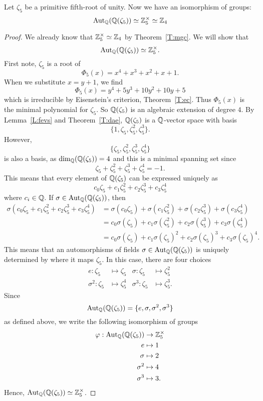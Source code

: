 \documentclass{ximera}
\begin{document}
\begin{example}[$\boldsymbol{\aut_{\pmb\Q}\pmb(\pmb\Q\pmb(\zeta_5\pmb)\pmb)}$]
  Let $\zeta_5$ be a primitive fifth-root of
  unity. Now we have an isomorphism of groups:
  \[
  \operatorname{Aut}_{\mathbb Q}(\mathbb Q(\zeta_5))\simeq\mathbb Z_5^\times\simeq \mathbb Z_4
  \]
  \begin{proof}
    We already know that $\mathbb Z_5^\times\simeq \mathbb Z_4$ by
    Theorem~\ref{T:mgc}. We will show that
    \[
    \operatorname{Aut}_{\mathbb Q}(\mathbb Q(\zeta_5))\simeq\mathbb Z_5^\times.
    \]
    First note, $\zeta_5$ is a root of
    \[
    \Phi_5(x) = x^4+x^3+x^2 + x + 1.
    \]
    When we substitute $x = y+ 1$, we find
    \[
    \Phi_5(x) = y^{4} +5y^3+10y^2+10y+5
    \]
    which is irreducible by Eisenstein's criterion,
    Theorem~\ref{T:ec}. Thus $\Phi_5(x)$ is the minimal polynomial for
    $\zeta_5$.  So $\mathbb Q(\zeta_5)$ is an algebraic extension of degree
    $4$.  By Lemma~\ref{L:fevs} and Theorem~\ref{T:dae}, $\mathbb Q(\zeta_5)$
    is a $\mathbb Q$-vector space with basis
    \[
    \{1,\zeta_5,\zeta_5^2,\zeta_5^3\}.
    \]
    However,
    \[
    \{\zeta_5,\zeta_5^2,\zeta_5^3,\zeta_5^4\}
    \]
    is also a basis, as $\dim_\mathbb Q(\mathbb Q(\zeta_5))=4$ and this is a minimal
    spanning set since
    \[
    \zeta_5 + \zeta_5^2  + \zeta_5^3 + \zeta_5^4 = -1.
    \]
    This means that every element of $\mathbb Q(\zeta_5)$ can be expressed
    uniquely as
    \[
    c_0\zeta_5 + c_1\zeta_5^2  + c_2\zeta_5^3 + c_3\zeta_5^4 
    \]
    where $c_i\in\mathbb Q$. If $\sigma\in\operatorname{Aut}_\mathbb Q(\mathbb Q(\zeta_5))$, then
    \begin{align*}
      \sigma(c_0\zeta_5 + c_1\zeta_5^2  + c_2\zeta_5^3 + c_3\zeta_5^4) &= \sigma(c_0\zeta_5) + \sigma(c_1 \zeta_5^2)+ \sigma(c_2 \zeta_5^3)+ \sigma(c_3 \zeta_5^4)\\
      &= c_0 \sigma(\zeta_5) + c_1 \sigma(\zeta_5^2) + c_2 \sigma(\zeta_5^3) + c_3 \sigma(\zeta_5^4)\\
      &= c_0 \sigma(\zeta_5) + c_1 \sigma(\zeta_5)^2 + c_2 \sigma(\zeta_5)^3 + c_3 \sigma(\zeta_5)^4.
    \end{align*}
    This means that an automorphisms of fields $\sigma \in
    \operatorname{Aut}_\mathbb Q(\mathbb Q(\zeta_5))$ is uniquely determined by where it maps
    $\zeta_5$. In this case, there are four choices
    \begin{align*}
      e :\zeta_5 &\mapsto \zeta_5 &  \sigma :\zeta_5 &\mapsto \zeta_5^2\\
      \sigma^2 :\zeta_5 &\mapsto \zeta_5^4 &  \sigma^3 :\zeta_5 &\mapsto \zeta_5^3.
    \end{align*}
    Since
    \[
    \operatorname{Aut}_\mathbb Q(\mathbb Q(\zeta_5)) = \{e,\sigma,\sigma^2,\sigma^3\}
    \]
    as defined above, we write the following isomorphism of groups
    \begin{align*}
      \varphi: \operatorname{Aut}_\mathbb Q(\mathbb Q(\zeta_5)) &\to \mathbb Z_5^\times\\
      e &\mapsto 1\\
      \sigma &\mapsto 2\\
      \sigma^2 &\mapsto 4\\
      \sigma^3 &\mapsto 3.
    \end{align*}
    Hence, $\operatorname{Aut}_\mathbb Q(\mathbb Q(\zeta_5))\simeq\mathbb Z_5^\times$.
  \end{proof}
\end{example}
\end{document}
